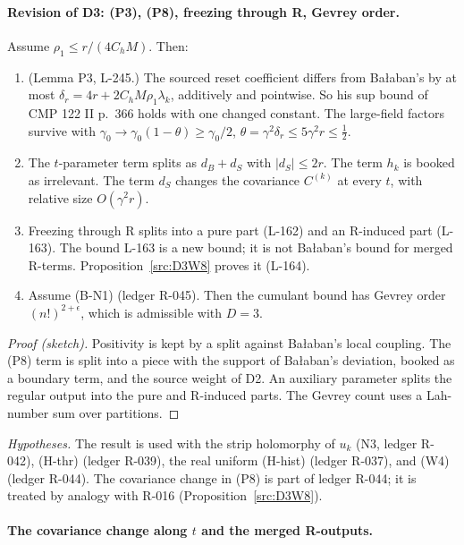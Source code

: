 \paragraph{Revision of D3: (P3), (P8), freezing through R, Gevrey order.}

\begin{proposition}\label{src:D3R}
Assume $\rho_1\le r/(4C_hM)$. Then:
\begin{enumerate}
\item[(a)] (Lemma P3, L-245.) The sourced reset coefficient differs from Ba{\l}aban's by at most $\delta_r=4r+2C_hM\rho_1\lambda_k$, additively and pointwise. So his sup bound of CMP 122 II p.~366 holds with one changed constant. The large-field factors survive with $\gamma_0\to\gamma_0(1-\theta)\ge\gamma_0/2$, $\theta=\gamma^2\delta_r\le5\gamma^2r\le\tfrac12$.
\item[(b)] The $t$-parameter term splits as $d_B+d_S$ with $|d_S|\le2r$. The term $h_k$ is booked as irrelevant. The term $d_S$ changes the covariance $C^{(k)}$ at every $t$, with relative size $O(\gamma^2r)$.
\item[(c)] Freezing through R splits into a pure part (L-162) and an R-induced part (L-163). The bound L-163 is a new bound; it is not Ba{\l}aban's bound for merged R-terms. Proposition~\ref{src:D3W8} proves it (L-164).
\item[(d)] Assume (B-N1) (ledger R-045). Then the cumulant bound has Gevrey order $(n!)^{2+\epsilon}$, which is admissible with $D=3$.
\end{enumerate}
\end{proposition}

\begin{proof}[Proof (sketch)]
Positivity is kept by a split against Ba{\l}aban's local coupling. The (P8) term is split into a piece with the support of Ba{\l}aban's deviation, booked as a boundary term, and the source weight of D2. An auxiliary parameter splits the regular output into the pure and R-induced parts. The Gevrey count uses a Lah-number sum over partitions.
\end{proof}

\emph{Hypotheses.} The result is used with the strip holomorphy of $u_k$ (N3, ledger R-042), (H-thr) (ledger R-039), the real uniform (H-hist) (ledger R-037), and (W4) (ledger R-044). The covariance change in (P8) is part of ledger R-044; it is treated by analogy with R-016 (Proposition~\ref{src:D3W8}).

\paragraph{The covariance change along $t$ and the merged R-outputs.}

